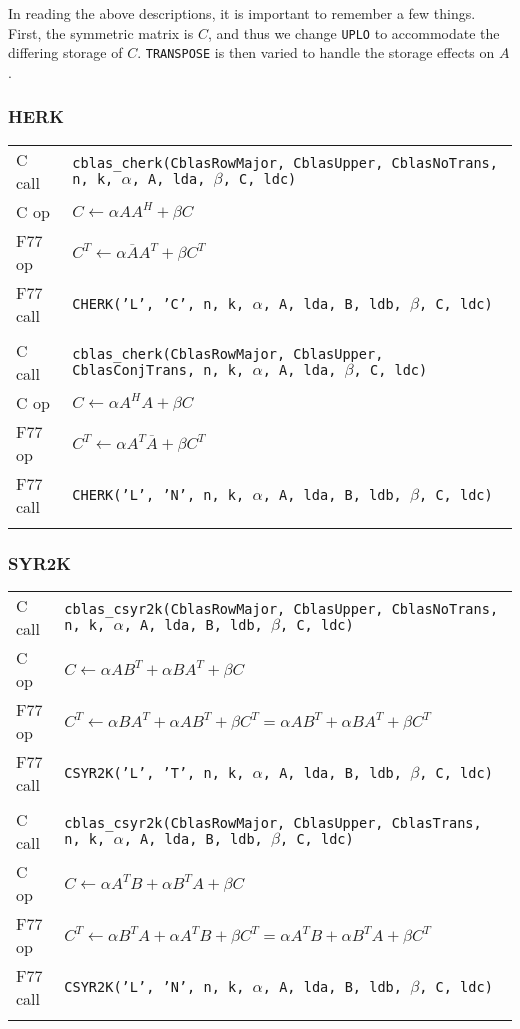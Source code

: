 \documentclass{article}
\begin{document}
In reading the above descriptions, it is important to remember a few things.
First, the symmetric matrix is $C$, and thus we change {\tt UPLO} to accommodate
the differing storage of $C$.  {\tt TRANSPOSE} is then varied to handle the
storage effects on $A$.

\subsubsection{HERK}
{\small
\begin{tabular}{ll}
C call   & {\tt cblas\_cherk(CblasRowMajor, CblasUpper, CblasNoTrans, n, k, $\alpha$, A, lda, $\beta$, C, ldc)}\\
C op     & $C \leftarrow \alpha A A^H + \beta C$\\
F77 op   & $C^T \leftarrow \alpha \overline{A} A^T + \beta C^T$\\
F77 call & {\tt CHERK('L', 'C', n, k, $\alpha$, A, lda, B, ldb, $\beta$, C, ldc)}\\\\
%
C call   & {\tt cblas\_cherk(CblasRowMajor, CblasUpper, CblasConjTrans, n, k, $\alpha$, A, lda, $\beta$, C, ldc)}\\
C op     & $C \leftarrow \alpha A^H A + \beta C$\\
F77 op   & $C^T \leftarrow \alpha A^T \overline{A} + \beta C^T$\\
F77 call & {\tt CHERK('L', 'N', n, k, $\alpha$, A, lda, B, ldb, $\beta$, C, ldc)}\\\\
\end{tabular}
}

\subsubsection{SYR2K}
{ \footnotesize
\begin{tabular}{ll}
C call   & {\tt cblas\_csyr2k(CblasRowMajor, CblasUpper, CblasNoTrans, n, k, $\alpha$, A, lda, B, ldb, $\beta$, C, ldc)}\\
C op     & $C \leftarrow \alpha A B^T + \alpha B A^T + \beta C$\\
F77 op   & $C^T \leftarrow \alpha B A^T + \alpha A B^T + \beta C^T =
           \alpha A B^T + \alpha B A^T + \beta C^T$\\
F77 call & {\tt CSYR2K('L', 'T', n, k, $\alpha$, A, lda, B, ldb, $\beta$, C, ldc)}\\\\
%
C call   & {\tt cblas\_csyr2k(CblasRowMajor, CblasUpper, CblasTrans, n, k, $\alpha$, A, lda, B, ldb, $\beta$, C, ldc)}\\
C op     & $C \leftarrow \alpha A^T B + \alpha B^T A + \beta C$\\
F77 op   & $C^T \leftarrow \alpha B^T A + \alpha A^T B + \beta C^T =
           \alpha A^T B + \alpha B^T A + \beta C^T$\\
F77 call & {\tt CSYR2K('L', 'N', n, k, $\alpha$, A, lda, B, ldb, $\beta$, C, ldc)}\\\\
\end{tabular}
}
\end{document}
